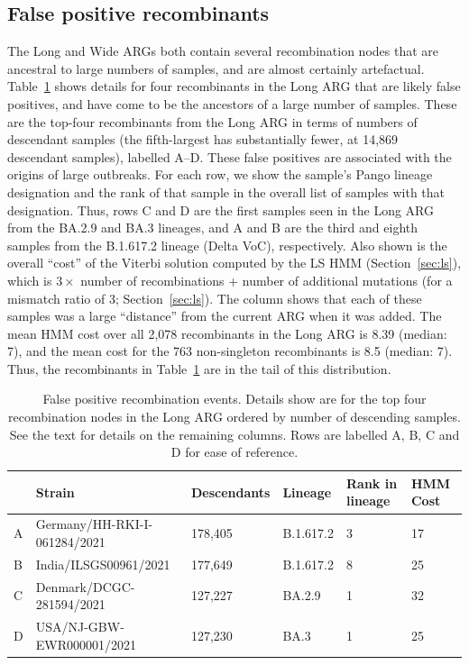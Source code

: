 \documentclass{article}
\begin{document}

\subsection{False positive recombinants}
\label{sec:false_positives}
The Long and Wide ARGs both contain several recombination nodes that are
ancestral to large numbers of samples, and are almost certainly
artefactual. Table~\ref{tab:false_positive} shows details for four recombinants
in the Long ARG that are likely false positives, and have come to be
the ancestors of a large number of samples. These are the top-four recombinants
from the Long ARG in terms of numbers of descendant samples
(the fifth-largest has substantially fewer, at 14,869 descendant samples),
labelled A--D. These false positives are associated with the origins
of large outbreaks. For each row, we show the sample's Pango lineage
designation and the rank of that sample in the overall list of
samples with that designation. Thus, rows C and D are the first
samples seen in the Long ARG from the BA.2.9 and BA.3 lineages,
and A and B are the third and eighth samples from the B.1.617.2
lineage (Delta VoC), respectively. Also shown is the overall ``cost'' of the Viterbi
solution computed by the LS HMM (Section~\ref{sec:ls}), which
is $3 \times$ number of recombinations + number of additional mutations
(for a mismatch ratio of 3; Section~\ref{sec:ls}).
The column shows that each of these samples was a large
``distance'' from the current ARG when it was added. The mean
HMM cost over all 2,078 recombinants in the Long ARG is 8.39
(median: 7), and the mean cost for the  763 non-singleton
recombinants is 8.5 (median: 7). Thus, the recombinants in
Table~\ref{tab:false_positive} are in the tail of this distribution.

\begin{table} \centering
\begin{tabular}{llllll}
\toprule
& Strain & Descendants & Lineage & Rank in lineage&HMM Cost \\
\midrule
A&Germany/HH-RKI-I-061284/2021 & 178,405    & B.1.617.2   & 3& 17  \\
B&India/ILSGS00961/2021        & 177,649    & B.1.617.2   & 8& 25   \\
C&Denmark/DCGC-281594/2021     & 127,227    & BA.2.9      & 1& 32 \\
D&USA/NJ-GBW-EWR000001/2021    & 127,230    & BA.3        & 1& 25 \\
\bottomrule
\end{tabular}
\caption{\label{tab:false_positive}
False positive recombination events. Details show are for the top
four recombination nodes in the Long ARG ordered by number of
descending samples. See the text for details on the remaining columns.
Rows are labelled A, B, C and D for ease of reference.}
\end{table}
\end{document}
